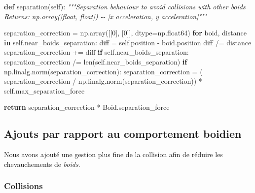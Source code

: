 \documentclass[
]{article}
\newenvironment{Shaded}{}{}
\newcommand{\BuiltInTok}[1]{#1}
\newcommand{\CommentTok}[1]{\textcolor[rgb]{0.38,0.63,0.69}{\textit{#1}}}
\newcommand{\ControlFlowTok}[1]{\textcolor[rgb]{0.00,0.44,0.13}{\textbf{#1}}}
\newcommand{\DecValTok}[1]{\textcolor[rgb]{0.25,0.63,0.44}{#1}}
\newcommand{\KeywordTok}[1]{\textcolor[rgb]{0.00,0.44,0.13}{\textbf{#1}}}
\newcommand{\NormalTok}[1]{#1}
\newcommand{\OperatorTok}[1]{\textcolor[rgb]{0.40,0.40,0.40}{#1}}
\newcommand{\VariableTok}[1]{\textcolor[rgb]{0.10,0.09,0.49}{#1}}
\begin{document}
\begin{Shaded}
\begin{Highlighting}[]
\KeywordTok{def}\NormalTok{ separation(}\VariableTok{self}\NormalTok{):}
    \CommentTok{"""Separation behaviour to avoid collisions with other boids}
\CommentTok{    Returns:}
\CommentTok{        np.array([float, float]) {-}{-} [x acceleration, y acceleration]"""}

\NormalTok{    separation\_correction }\OperatorTok{=}\NormalTok{ np.array([[}\DecValTok{0}\NormalTok{], [}\DecValTok{0}\NormalTok{]], dtype}\OperatorTok{=}\NormalTok{np.float64)}
    \ControlFlowTok{for}\NormalTok{ boid, distance }\KeywordTok{in} \VariableTok{self}\NormalTok{.near\_boids\_separation:}
\NormalTok{        diff }\OperatorTok{=} \VariableTok{self}\NormalTok{.position }\OperatorTok{{-}}\NormalTok{ boid.position}
\NormalTok{        diff }\OperatorTok{/=}\NormalTok{ distance}
\NormalTok{        separation\_correction }\OperatorTok{+=}\NormalTok{ diff}
    \ControlFlowTok{if} \VariableTok{self}\NormalTok{.near\_boids\_separation:}
\NormalTok{        separation\_correction }\OperatorTok{/=} \BuiltInTok{len}\NormalTok{(}\VariableTok{self}\NormalTok{.near\_boids\_separation)}
    \ControlFlowTok{if}\NormalTok{ np.linalg.norm(separation\_correction):}
\NormalTok{        separation\_correction }\OperatorTok{=}\NormalTok{ (}
\NormalTok{            separation\_correction }\OperatorTok{/}\NormalTok{ np.linalg.norm(separation\_correction)) }\OperatorTok{*} \VariableTok{self}\NormalTok{.max\_separation\_force}

    \ControlFlowTok{return}\NormalTok{ separation\_correction }\OperatorTok{*}\NormalTok{ Boid.separation\_force}
\end{Highlighting}
\end{Shaded}

\hypertarget{ajouts-par-rapport-au-comportement-boidien}{%
\subsection{Ajouts par rapport au comportement
boidien}\label{ajouts-par-rapport-au-comportement-boidien}}

Nous avons ajouté une gestion plus fine de la collision afin de réduire
les chevauchements de \emph{boids}.

\hypertarget{collisions}{%
\subsubsection{Collisions}\label{collisions}}
\end{document}
